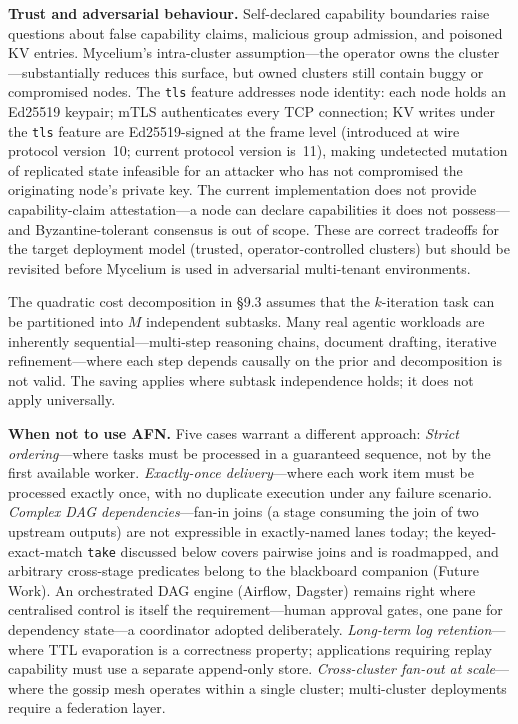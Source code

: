 \documentclass[11pt]{article}
\begin{document}
\textbf{Trust and adversarial behaviour.} Self-declared capability boundaries
raise questions about false capability claims, malicious group admission, and
poisoned KV entries. Mycelium's intra-cluster assumption---the operator owns the
cluster---substantially reduces this surface, but owned clusters still contain
buggy or compromised nodes. The \texttt{tls} feature addresses node identity:
each node holds an Ed25519 keypair; mTLS authenticates every TCP connection;
KV writes under the \texttt{tls} feature are Ed25519-signed at the frame level
(introduced at wire protocol version~10; current protocol version is~11),
making undetected mutation of replicated state infeasible for
an attacker who has not compromised the originating node's private key. The
current implementation does not provide capability-claim attestation---a node
can declare capabilities it does not possess---and Byzantine-tolerant consensus
is out of scope. These are correct tradeoffs for the target deployment model
(trusted, operator-controlled clusters) but should be revisited before Mycelium
is used in adversarial multi-tenant environments.

The quadratic cost decomposition in \S9.3 assumes that the $k$-iteration task
can be partitioned into $M$ independent subtasks. Many real agentic workloads
are inherently sequential---multi-step reasoning chains, document drafting,
iterative refinement---where each step depends causally on the prior and
decomposition is not valid. The saving applies where subtask independence holds;
it does not apply universally.

\textbf{When not to use AFN.} Five cases warrant a different approach:
\emph{Strict ordering}---where tasks must be processed in a guaranteed sequence,
not by the first available worker.
\emph{Exactly-once delivery}---where each work item must be processed exactly
once, with no duplicate execution under any failure scenario.
\emph{Complex DAG dependencies}---fan-in joins (a stage consuming the join of
two upstream outputs) are not expressible in exactly-named lanes today; the
keyed-exact-match \texttt{take} discussed below covers pairwise joins and is
roadmapped, and arbitrary cross-stage predicates belong to the blackboard
companion (Future Work). An orchestrated DAG engine (Airflow, Dagster) remains
right where centralised control is itself the requirement---human approval
gates, one pane for dependency state---a coordinator adopted deliberately.
\emph{Long-term log retention}---where TTL evaporation is a correctness property;
applications requiring replay capability must use a separate append-only store.
\emph{Cross-cluster fan-out at scale}---where the gossip mesh operates within a
single cluster; multi-cluster deployments require a federation layer.
\end{document}
